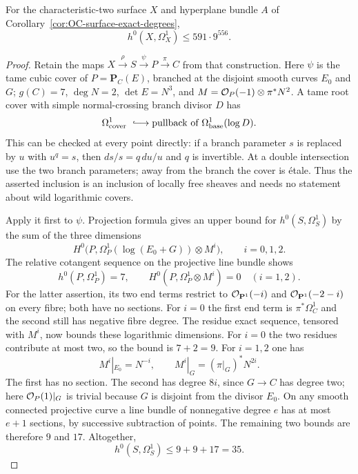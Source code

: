 \begin{lemma}
\label{lem:OC-explicit-differential-bound}
For the characteristic-two surface $X$ and hyperplane bundle $A$ of
Corollary~\ref{cor:OC-surface-exact-degrees},
\[
                          h^0(X,\Omega_X^1)\leq591\cdot9^{556}.
\]
\end{lemma}
\begin{proof}
Retain the maps $X\xrightarrow{\rho}S\xrightarrow{\psi}P\xrightarrow{\pi}C$ from that construction.  Here
$\psi$ is the tame cubic cover of $P=\mathbf P_C(E)$, branched at the disjoint smooth curves $E_0$ and $G$; $g(C)=7$, $\deg N=2$, $\det E=N^3$, and
$M=\mathcal O_P(-1)\otimes\pi^*N^2$.
A tame root cover with simple normal-crossing branch divisor $D$ has
\[
 \Omega^1_{\rm cover}\ \lhook\joinrel\longrightarrow
                \text{pullback of }\Omega^1_{\rm base}(\log D).
\]
This can be checked at every point directly: if a branch parameter $s$ is replaced by $u$ with $u^q=s$, then $ds/s=q\,du/u$ and $q$ is invertible.  At a double intersection use the two branch parameters; away from the branch the cover is \'etale.  Thus the asserted inclusion is an inclusion of locally free sheaves and needs no statement about wild logarithmic covers.

Apply it first to $\psi$.  Projection formula gives an upper bound for $h^0(S,\Omega_S^1)$ by the sum of the three dimensions
\[
 H^0\bigl(P,\Omega_P^1(\log(E_0+G))\otimes M^i\bigr),
                              \qquad i=0,1,2.
\]
The relative cotangent sequence on the projective line bundle shows
\[
 h^0(P,\Omega_P^1)=7,
 \qquad H^0(P,\Omega_P^1\otimes M^i)=0\quad(i=1,2).
\]
For the latter assertion, its two end terms restrict to
$\mathcal O_{\mathbf P^1}(-i)$ and $\mathcal O_{\mathbf P^1}(-2-i)$ on every fibre; both have no sections.  For $i=0$ the first end term is $\pi^*\Omega_C^1$ and the second still has negative fibre degree.
The residue exact sequence, tensored with $M^i$, now bounds these logarithmic dimensions.
For $i=0$ the two residues contribute at most two, so the bound is $7+2=9$.
For $i=1,2$ one has
\[
 M^i|_{E_0}=N^{-i},\qquad
 M^i|_G=(\pi|_G)^*N^{2i}.
\]
The first has no section.  The second has degree $8i$, since $G\to C$ has degree two; here $\mathcal O_P(1)|_G$ is trivial because $G$ is disjoint from the divisor $E_0$.  On any smooth connected projective curve a line bundle of nonnegative degree $e$ has at most $e+1$ sections, by successive subtraction of points.  The remaining two bounds are therefore $9$ and $17$.  Altogether,
\[
                         h^0(S,\Omega_S^1)\leq9+9+17=35.
\]


\end{proof}

